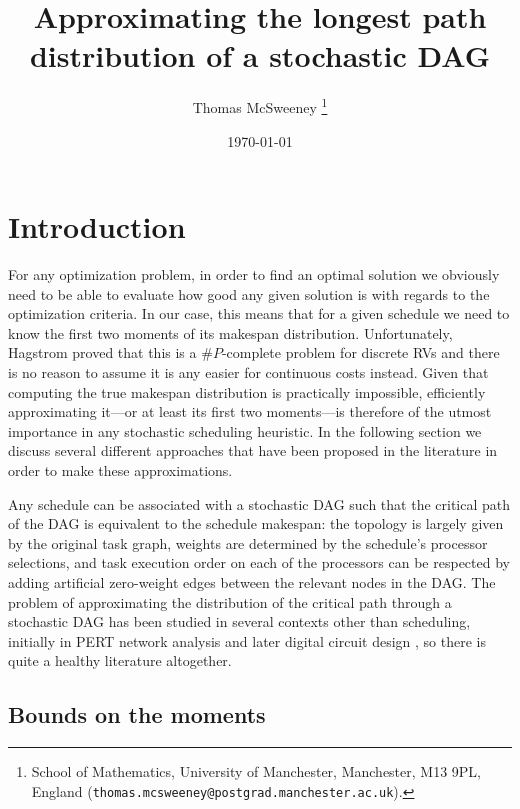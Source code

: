 \documentclass[12pt]{article}
\title{Approximating the longest path distribution of a stochastic DAG} %
\author{Thomas McSweeney%
	\thanks{%
		School of Mathematics,
		University of Manchester,
		Manchester, M13 9PL, England
		(\texttt{thomas.mcsweeney@postgrad.manchester.ac.uk}).
	}
}
\date{\today}
\begin{document}
	\maketitle 	


\section{Introduction}
\label{sect.intro}

For any optimization problem, in order to find an optimal solution we obviously need to be able to evaluate how good any given solution is with regards to the optimization criteria. In our case, this means that for a given schedule we need to know the first two moments of its makespan distribution. Unfortunately, Hagstrom \cite{hag88} proved that this is a $\#P$-complete problem for discrete RVs and there is no reason to assume it is any easier for continuous costs instead. Given that computing the true makespan distribution is practically impossible, efficiently approximating it---or at least its first two moments---is therefore of the utmost importance in any stochastic scheduling heuristic. In the following section we discuss several different approaches that have been proposed in the literature in order to make these approximations.

Any schedule can be associated with a stochastic DAG such that the critical path of the DAG is equivalent to the schedule makespan: the topology is largely given by the original task graph, weights are determined by the schedule's processor selections, and task execution order on each of the processors can be respected by adding artificial zero-weight edges between the relevant nodes in the DAG. The problem of approximating the distribution of the critical path through a stochastic DAG has been studied in several contexts other than scheduling, initially in PERT network analysis \cite{mal59} and later digital circuit design \cite{bla08}, so there is quite a healthy literature altogether. 

\subsection{Bounds on the moments}
\label{subsect.stochastic_bounds}
\end{document}
